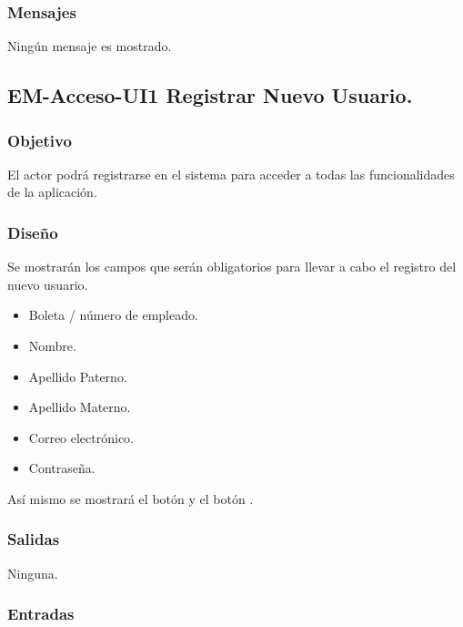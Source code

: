 \subsubsection{Mensajes}
	\begin{Citemize}
		\item Ningún mensaje es mostrado.
	\end{Citemize}

\subsection{EM-Acceso-UI1 Registrar Nuevo Usuario.}

\subsubsection{Objetivo}
	\noindent
	El actor podrá registrarse en el sistema para acceder a todas las funcionalidades de la aplicación.

\subsubsection{Diseño}
	\noindent
	Se mostrarán los campos que serán obligatorios para llevar a cabo el registro del nuevo usuario.
	\begin{itemize}
		\item Boleta / número de empleado.
		\item Nombre.
		\item Apellido Paterno.
		\item Apellido Materno.
		\item Correo electrónico.
		\item Contraseña.
	\end{itemize}

	\noindent
	Así mismo se mostrará el botón  y el botón .

\pagebreak
{}

\subsubsection{Salidas}
	\noindent
	Ninguna.

\subsubsection{Entradas}
	
